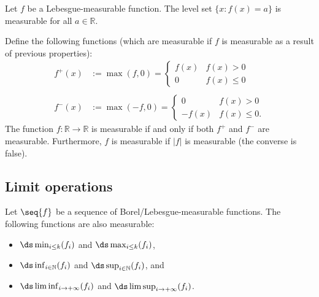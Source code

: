     \begin{property}
        Let $f$ be a Lebesgue-measurable function. The level set $\{x:f(x) = a\}$ is measurable for all $a\in\mathbb{R}$.
    \end{property}

    \begin{property}
        Define the following functions (which are measurable if $f$ is measurable as a result of previous properties):
        \begin{align}
            \label{lebesgue:positive_part}
            f^+(x) &:= \max(f,0) =
            \begin{cases}
                f(x)&f(x)>0\\
                0&f(x)\leq0
            \end{cases}\\\nonumber\\
            \label{lebesgue:negative_part}
            f^-(x) &:= \max(-f,0) =
            \begin{cases}
                0&f(x)>0\\
                -f(x)&f(x)\leq0.
            \end{cases}
        \end{align}
        The function $f:\mathbb{R}\rightarrow\mathbb{R}$ is measurable if and only if both $f^+$ and $f^-$ are measurable. Furthermore, $f$ is measurable if $|f|$ is measurable (the converse is false).
    \end{property}

\subsection{Limit operations}

    \begin{property}
        Let $\seq{f}$ be a sequence of Borel/Lebesgue-measurable functions. The following functions are also measurable:
        \begin{itemize}
            \item $\ds\min_{i\leq k}(f_i)$ and $\ds\max_{i\leq k}(f_i)$,
            \item $\ds\inf_{i\in\mathbb{N}}(f_i)$ and $\ds\sup_{i\in\mathbb{N}}(f_i)$, and
            \item $\ds\liminf_{i\rightarrow+\infty}(f_i)$ and $\ds\limsup_{i\rightarrow+\infty}(f_i)$.
        \end{itemize}
    \end{property}

